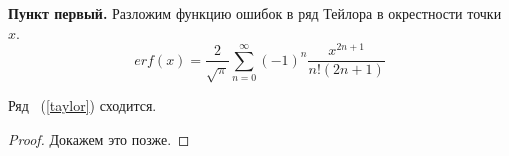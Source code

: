 {\bf Пункт первый.} Разложим функцию ошибок в ряд Тейлора в окрестности точки $x$.
\begin{equation}
	\label{taylor}
	erf(x) = \frac{2}{\sqrt{\pi}}\sum^{\infty}_{n = 0}(-1)^n \frac{x^{2n+1}}{n!(2n+1)}
\end{equation}
\begin{theorem}
	Ряд ~(\ref{taylor}) сходится.
\end{theorem}
\begin{proof}
	Докажем это позже.
\end{proof}